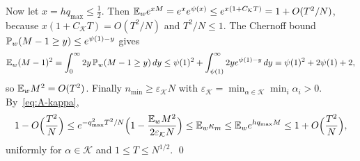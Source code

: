 Now let $x=hq_{\max}\le\frac12$. Then
$\mathbb{E}_we^{xM}=e^xe^{\psi(x)}\le e^{x(1+C_{\mathcal K}T)}=1+O(T^2/N)$, because
$x(1+C_{\mathcal K}T)=O(T^2/N)$ and $T^2/N\le1$. The Chernoff bound
$\mathbb{P}_w(M-1\ge y)\le e^{\psi(1)-y}$ gives
\[
\mathbb{E}_w(M-1)^2=\int_0^\infty2y\,\mathbb{P}_w(M-1\ge y)\,dy
\le\psi(1)^2+\int_{\psi(1)}^\infty2ye^{\psi(1)-y}\,dy
=\psi(1)^2+2\psi(1)+2,
\]
so $\mathbb{E}_wM^2=O(T^2)$. Finally $n_{\min}\ge\varepsilon_{\mathcal K}N$ with
$\varepsilon_{\mathcal K}=\min_{\alpha\in\mathcal K}\min_i\alpha_i>0$.
By~\eqref{eq:A-kappa},
\[
1-O\Bigl(\frac{T^2}N\Bigr)\le e^{-q_{\max}^2T^2/N}
\Bigl(1-\frac{\mathbb{E}_wM^2}{2\varepsilon_{\mathcal K}N}\Bigr)
\le\mathbb{E}_w\kappa_m\le\mathbb{E}_we^{hq_{\max}M}\le1+O\Bigl(\frac{T^2}N\Bigr),
\]
uniformly for $\alpha\in\mathcal K$ and $1\le T\le N^{1/2}$. \qed
